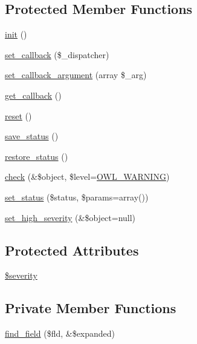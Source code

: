 \subsection*{Protected Member Functions}
\begin{DoxyCompactItemize}
\item 
\hyperlink{class__OWL_ae0ef3ded56e8a6b34b6461e5a721cd3e}{init} ()
\item 
\hyperlink{class__OWL_a28d9025eaf37b49d63cb334ed28c33f0}{set\_\-callback} (\$\_\-dispatcher)
\item 
\hyperlink{class__OWL_a1e26611ce858b237f5a98a91ea3c3a1b}{set\_\-callback\_\-argument} (array \$\_\-arg)
\item 
\hyperlink{class__OWL_abded13b1c97ea6e0cfe3c68cb6bcf7a5}{get\_\-callback} ()
\item 
\hyperlink{class__OWL_a2f2a042bcf31965194c03033df0edc9b}{reset} ()
\item 
\hyperlink{class__OWL_a9e49b9c76fbc021b244c6915ea536d71}{save\_\-status} ()
\item 
\hyperlink{class__OWL_a465eeaf40edd9f9c848841700c32ce55}{restore\_\-status} ()
\item 
\hyperlink{class__OWL_ae2e3c56e5f3c4ce4156c6b1bb1c50f63}{check} (\&\$object, \$level=\hyperlink{owl_8severitycodes_8php_ace886152e2e86cd2e91cb833fd495adb}{OWL\_\-WARNING})
\item 
\hyperlink{class__OWL_aea912d0ede9b3c2a69b79072d94d4787}{set\_\-status} (\$status, \$params=array())
\item 
\hyperlink{class__OWL_a576829692a3b66e3d518853bf43abae3}{set\_\-high\_\-severity} (\&\$object=null)
\end{DoxyCompactItemize}
\subsection*{Protected Attributes}
\begin{DoxyCompactItemize}
\item 
\hyperlink{class__OWL_ad26b40a9dbbacb33e299b17826f8327c}{\$severity}
\end{DoxyCompactItemize}
\subsection*{Private Member Functions}
\begin{DoxyCompactItemize}
\item 
\hyperlink{classDataHandler_a1e4789e22370c96ae479bc3a58f30984}{find\_\-field} (\$fld, \&\$expanded)
\end{DoxyCompactItemize}
